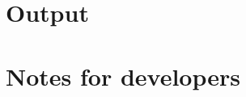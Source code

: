\documentclass[	11pt,
				a4paper,
				abstract=true,
				twoside=true,
				bibliography=totoc, 
				headinclude=true,
				footinclude=false]{scrartcl}
\begin{document}
\section{Output}

\section{Notes for developers}



\end{document}
